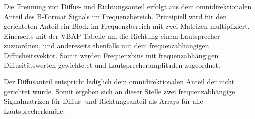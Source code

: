 Die Trennung von Diffus- und Richtungsanteil erfolgt aus dem omnidirektionalen Anteil des B-Format Signals im Frequenzbereich. Prinzipiell wird für den gerichteten Anteil ein Block im Frequenzbereich mit zwei Matrizen multipliziert. Einerseits mit der VBAP-Tabelle um die Richtung einem Lautsprecher zuzuordnen, und andereseits ebenfalls mit dem frequenzabhängigen Diffusheitsvektor. Somit werden Frequenzbins mit frequenzabhängigen Diffusitätswerten gewichtetet und  Lautsprecheramplituden zugeordnet.

Der Diffusanteil entspricht lediglich dem omnidirektionalen Anteil der nicht gerichtet wurde. Somit ergeben sich an dieser Stelle zwei frequenzabhängige Signalmatrizen für Diffus- und Richtungsanteil als Arrays für alle Lautsprecherkanäle.